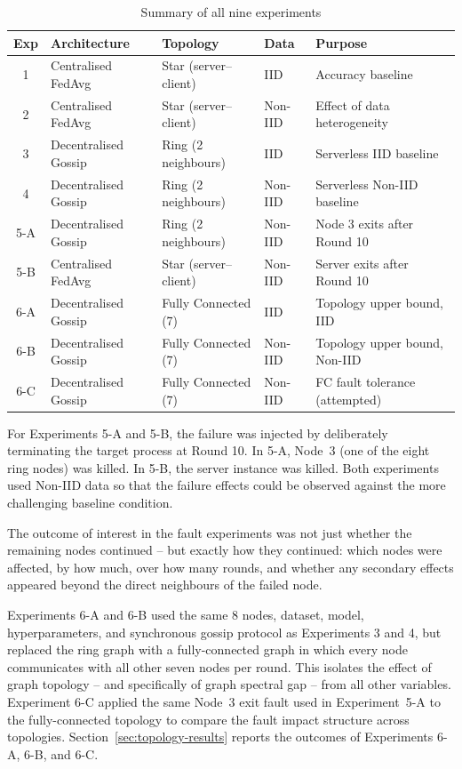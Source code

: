 \documentclass[12pt]{report}
\begin{document}
\begin{table}[H]
\centering
\begin{tabular}{clllp{4.5cm}}
\toprule
\textbf{Exp} & \textbf{Architecture} & \textbf{Topology} & \textbf{Data} & \textbf{Purpose} \\
\midrule
1   & Centralised FedAvg   & Star (server--client) & IID         & Accuracy baseline \\
2   & Centralised FedAvg   & Star (server--client) & Non-IID     & Effect of data heterogeneity \\
3   & Decentralised Gossip & Ring (2 neighbours)   & IID         & Serverless IID baseline \\
4   & Decentralised Gossip & Ring (2 neighbours)   & Non-IID     & Serverless Non-IID baseline \\
5-A & Decentralised Gossip & Ring (2 neighbours)   & Non-IID     & Node 3 exits after Round 10 \\
5-B & Centralised FedAvg   & Star (server--client) & Non-IID     & Server exits after Round 10 \\
6-A & Decentralised Gossip & Fully Connected (7)   & IID         & Topology upper bound, IID \\
6-B & Decentralised Gossip & Fully Connected (7)   & Non-IID     & Topology upper bound, Non-IID \\
6-C & Decentralised Gossip & Fully Connected (7)   & Non-IID     & FC fault tolerance (attempted) \\
\bottomrule
\end{tabular}
\vspace{0.5cm}
\caption{Summary of all nine experiments}
\label{tab:experiments}
\end{table}

For Experiments 5-A and 5-B, the failure was injected by deliberately terminating
the target process at Round 10. In 5-A, Node~3 (one of the eight ring nodes)
was killed. In 5-B, the server instance was killed. Both experiments used Non-IID
data so that the failure effects could be observed against the more challenging
baseline condition.

The outcome of interest in the fault experiments was not just whether the
remaining nodes continued -- but exactly how they continued: which nodes were
affected, by how much, over how many rounds, and whether any secondary effects
appeared beyond the direct neighbours of the failed node.

Experiments 6-A and 6-B used the same 8 nodes, dataset, model, hyperparameters,
and synchronous gossip protocol as Experiments 3 and 4, but replaced the ring
graph with a fully-connected graph in which every node communicates with all
other seven nodes per round. This isolates the effect of graph topology -- and
specifically of graph spectral gap -- from all other variables. Experiment 6-C
applied the same Node~3 exit fault used in Experiment~5-A to the fully-connected
topology to compare the fault impact structure across topologies. Section~\ref{sec:topology-results}
reports the outcomes of Experiments 6-A, 6-B, and 6-C.
\end{document}

